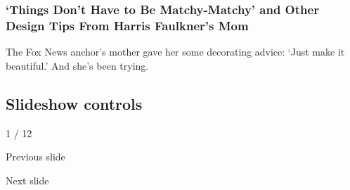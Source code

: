 \hypertarget{things-dont-have-to-be-matchy-matchy-and-other-design-tips-from-harris-faulkners-mom-1}{%
\subsubsection{`Things Don't Have to Be Matchy-Matchy' and Other Design
Tips From Harris Faulkner's
Mom}\label{things-dont-have-to-be-matchy-matchy-and-other-design-tips-from-harris-faulkners-mom-1}}

The Fox News anchor's mother gave her some decorating advice: `Just make
it beautiful.' And she's been trying.

\hypertarget{slideshow-controls}{%
\subsection{Slideshow controls}\label{slideshow-controls}}

1 / 12

Previous slide

Next slide
